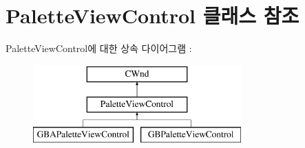 \hypertarget{class_palette_view_control}{}\section{Palette\+View\+Control 클래스 참조}
\label{class_palette_view_control}
Palette\+View\+Control에 대한 상속 다이어그램 \+: \begin{figure}[H]
\begin{center}
\leavevmode
\includegraphics[height=3.000000cm]{class_palette_view_control}
\end{center}
\end{figure}
